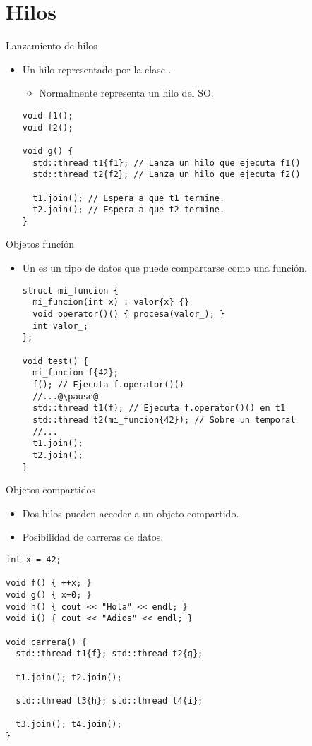 \section{Hilos}

\begin{frame}[t,fragile]{Lanzamiento de hilos}
\begin{itemize}
  \item Un hilo representado por la clase .
    \begin{itemize}
      \item Normalmente representa un hilo del SO.
    \end{itemize}
\begin{lstlisting}
void f1();
void f2();

void g() {
  std::thread t1{f1}; // Lanza un hilo que ejecuta f1()
  std::thread t2{f2}; // Lanza un hilo que ejecuta f2()

  t1.join(); // Espera a que t1 termine.
  t2.join(); // Espera a que t2 termine.
}
\end{lstlisting}
\end{itemize}
\end{frame}

\begin{frame}[t,fragile]{Objetos función}
\begin{itemize}
  \item Un  es un tipo de datos que puede compartarse
        como una función.
\begin{lstlisting}[escapechar=@]
struct mi_funcion {
  mi_funcion(int x) : valor{x} {}
  void operator()() { procesa(valor_); }
  int valor_;
};

void test() {
  mi_funcion f{42};
  f(); // Ejecuta f.operator()()
  //...@\pause@
  std::thread t1(f); // Ejecuta f.operator()() en t1
  std::thread t2(mi_funcion{42}); // Sobre un temporal
  //...
  t1.join();
  t2.join();
}
\end{lstlisting}

\end{itemize}
\end{frame}

\begin{frame}[t,fragile]{Objetos compartidos}
\begin{itemize}
  \item Dos hilos pueden acceder a un objeto compartido.
  \item Posibilidad de carreras de datos.
\end{itemize}
\begin{lstlisting}
int x = 42;

void f() { ++x; }
void g() { x=0; }
void h() { cout << "Hola" << endl; }
void i() { cout << "Adios" << endl; }

void carrera() {
  std::thread t1{f}; std::thread t2{g};

  t1.join(); t2.join();

  std::thread t3{h}; std::thread t4{i};

  t3.join(); t4.join();
}
\end{lstlisting}
\end{frame}


